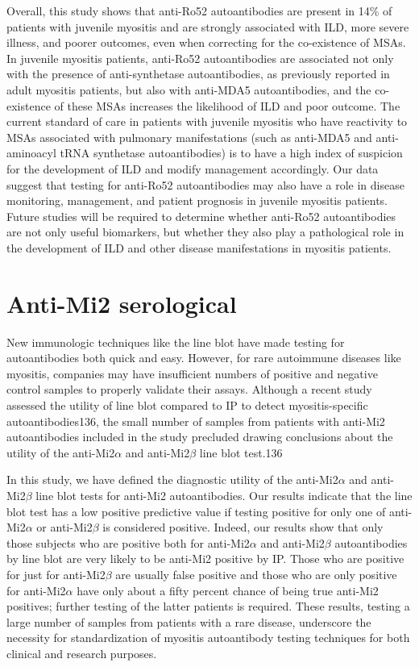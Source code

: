Overall, this study shows that anti-Ro52 autoantibodies are present in 14\% of patients with juvenile myositis and are strongly associated with ILD, more severe illness, and poorer outcomes, even when correcting for the co-existence of MSAs. In juvenile myositis patients, anti-Ro52 autoantibodies are associated not only with the presence of anti-synthetase autoantibodies, as previously reported in adult myositis patients, but also with anti-MDA5 autoantibodies, and the co-existence of these MSAs increases the likelihood of ILD and poor outcome. The current standard of care in patients with juvenile myositis who have reactivity to MSAs associated with pulmonary manifestations (such as anti-MDA5 and anti-aminoacyl tRNA synthetase autoantibodies) is to have a high index of suspicion for the development of ILD and modify management accordingly. Our data suggest that testing for anti-Ro52 autoantibodies may also have a role in disease monitoring, management, and patient prognosis in juvenile myositis patients. Future studies will be required to determine whether anti-Ro52 autoantibodies are not only useful biomarkers, but whether they also play a pathological role in the development of ILD and other disease manifestations in myositis patients.

\section{Anti-Mi2 serological}
New immunologic techniques like the line blot have made testing for autoantibodies both quick and easy. However, for rare autoimmune diseases like myositis, companies may have insufficient numbers of positive and negative control samples to properly validate their assays. Although a recent study assessed the utility of line blot compared to IP to detect myositis-specific autoantibodies136, the small number of samples from patients with anti-Mi2 autoantibodies included in the study precluded drawing conclusions about the utility of the anti-Mi2$\alpha$ and anti-Mi2$\beta$ line blot test.136 

In this study, we have defined the diagnostic utility of the anti-Mi2$\alpha$ and anti-Mi2$\beta$ line blot tests for anti-Mi2 autoantibodies.  Our results indicate that the line blot test has a low positive predictive value if testing positive for only one of anti-Mi2$\alpha$ or anti-Mi2$\beta$ is considered positive. Indeed, our results show that only those subjects who are positive both for anti-Mi2$\alpha$ and anti-Mi2$\beta$ autoantibodies by line blot are very likely to be anti-Mi2 positive by IP. Those who are positive for just for anti-Mi2$\beta$ are usually false positive and those who are only positive for anti-Mi2$\alpha$ have only about a fifty percent chance of being true anti-Mi2 positives; further testing of the latter patients is required. These results, testing a large number of samples from patients with a rare disease, underscore the necessity for standardization of myositis autoantibody testing techniques for both clinical and research purposes. 


